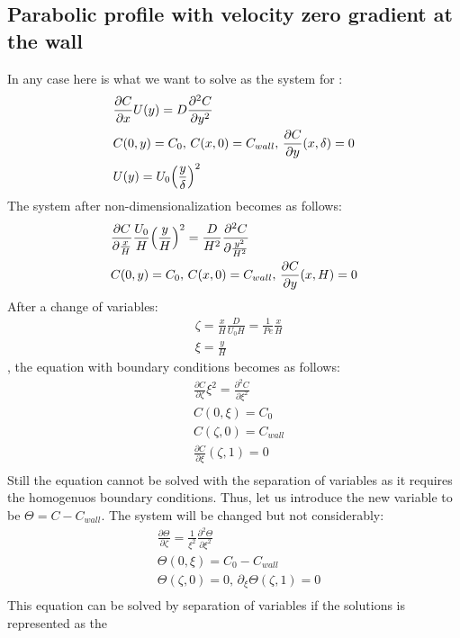 \documentclass{article}
\newcommand{\beq}{\begin{equation}}
\newcommand{\feq}{\end{equation}}
\begin{document}
\subsection{Parabolic profile with velocity zero gradient at the wall}
In any case here is what we want to solve as the system for :
\beq
\begin{aligned}
&\frac{\partial C}{\partial x} U(y)=D\frac{\partial^2 C}{\partial y^2}\\
&C(0,y)=C_0,\, C(x,0)=C_{wall},\, \frac{\partial C}{\partial y }(x,\delta)=0\\
&U(y)=U_0 \Bigl(\frac{y}{\delta}\Bigr)^2
\end{aligned}
\feq
The system after non-dimensionalization becomes as follows:
\beq
\begin{aligned}
&\frac{\partial C}{\partial \frac{x}{H}} \frac{U_0}{H}
\Bigl(\frac{y}{H}\Bigr)^2=\frac{D}{H^2}\frac{\partial^2 C}{\partial \frac{y^2}{H^2}}\\
&C(0,y)=C_0,\, C(x,0)=C_{wall},\, \frac{\partial C}{\partial y }(x,H)=0\\
\end{aligned}
\feq
After a change of variables:
\beq
\begin{aligned}
&\zeta=\frac{x}{H} \frac{D}{U_0 H}=\frac{1}{Pe}\frac{x}{H}\\
&\xi=\frac{y}{H}
\end{aligned}
\feq
, the equation with boundary conditions becomes as follows:
\beq
\begin{aligned}
&\frac{\partial C}{\partial \zeta}\xi^2=\frac{\partial^2 C}{\partial \xi^2}\\
&C(0,\xi)=C_0\\
&C(\zeta,0)=C_{wall}\\
&\frac{\partial C}{\partial \xi}(\zeta,1)=0\\
\end{aligned}
\feq 
Still the equation cannot be solved with the separation of variables as it requires the homogenuos
boundary conditions. Thus, let us introduce the new variable to be $\Theta=C-C_{wall}$. The system
will be changed but not considerably:
\beq
\begin{aligned}
&\frac{\partial \Theta}{\partial \zeta}=\frac{1}{\xi^2}\frac{\partial^2 \Theta}{\partial \xi^2}\\
&\Theta(0,\xi)=C_0-C_{wall}\\
&\Theta(\zeta,0)=0,\, \partial_{\xi}\Theta(\zeta,1)=0\\
\end{aligned}
\feq 
This equation can be solved by separation of variables if the solutions is represented as the
\end{document}
